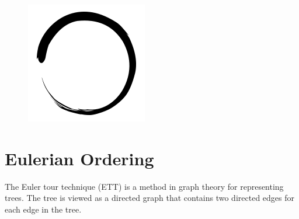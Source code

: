\documentclass[12pt]{article}
\title{\vspace{-2em}\mytitle\vspace{-0.3em}}
\author{\textbf{Editor}\\Kayacan Vesek\\ \ \\ \textbf{Reviewer} \\Yasin Kaya}
\date{}
\begin{document}
\begin{figure}
  \centering
  \includegraphics[width=\linewidth/4]{inzva-logo.png}
  \label{fig:inzva}
\end{figure}
\maketitle

\cleardoublepage
\tableofcontents
{}
\cleardoublepage
\newcommand{\sectionbreak}{\clearpage}



\section{Eulerian Ordering} 

The Euler tour technique (ETT) is a method in graph theory for representing trees. The tree is viewed as a directed graph that contains two directed edges for each edge in the tree.
\cite{1,2}
\end{document}

